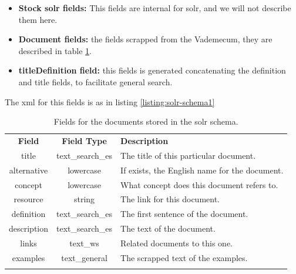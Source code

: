 \begin{itemize}
 \item \textbf{Stock solr fields: } This fields are internal for solr, and we will not describe them here.
 \item \textbf{Document fields: } the fields scrapped from the Vademecum, they are described in table \ref{tab:schema-docfields}.
 \item \textbf{titleDefinition field: } this fields is generated concatenating the definition and title fields, to facilitate general search.
\end{itemize}

The xml for this fields is as in listing \ref{listing:solr-schema1}

\label{listing:solr-schema1}

\begin{center}
  \centering
  \begin{table}
  \begin{center}
    \begin{tabular*}{0.655\textwidth}{@{\extracolsep{\fill}} | c | c | p{} |}
      \hhline{|-|-|-|}
      \textbf{Field} & \textbf{Field Type} & \textbf{Description} \\ \hhline{|=|=|=|}
      title & text\_search\_es & The title of this particular document.  \\ \hhline{|-|-|-|}
      alternative & lowercase & If exists, the English name for the document. \\ \hhline{|-|-|-|}
      concept & lowercase & What concept does this document refers to. \\ \hhline{|-|-|-|}
      resource & string & The link for this document. \\ \hhline{|-|-|-|}
      definition & text\_search\_es & The first sentence of the document. \\ \hhline{|-|-|-|}
      description & text\_search\_es & The text of the document. \\ \hhline{|-|-|-|}
      links & text\_ws & Related documents to this one. \\ \hhline{|-|-|-|}
      examples & text\_general & The scrapped text of the examples. \\ \hhline{|-|-|-|}
      \end{tabular*}
    \caption{Fields for the documents stored in the solr schema.}
    \label{tab:schema-docfields}
    \end{center}
  \end{table}
\end{center}

